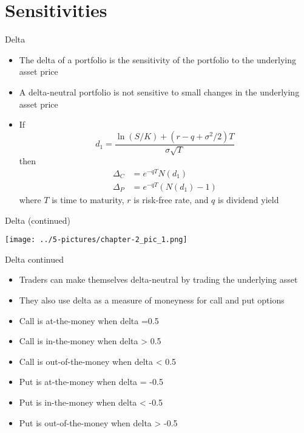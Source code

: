 \documentclass[11pt]{beamer}
\begin{document}
\section{Sensitivities}
\begin{frame}{Delta}
	\begin{itemize}
		\item The delta of a portfolio is the sensitivity of the portfolio to the underlying asset price
		\item A delta-neutral portfolio is not sensitive to small changes in the underlying asset price
		\item If   $$d_1=\frac{\ln(S/K)+(r-q+\sigma^2/2)T}{\sigma\sqrt{T}}$$ then \begin{align*}\Delta_C &= e^{-qT}N(d_1) \\ \Delta_P &= e^{-qT}\left(N(d_1)-1 \right)\end{align*} where $T$ is time to maturity, $r$ is risk-free rate, and $q$ is dividend yield
	\end{itemize}
\end{frame}
\begin{frame}{Delta (continued)}
	 
	\begin{center}
	\texttt{[image: ../5-pictures/chapter-2\_pic\_1.png]}
	\end{center}
\end{frame}
\begin{frame}{Delta continued}
	\begin{itemize}
		\item Traders can make themselves delta-neutral by trading the underlying asset
		\item They also use delta as a measure of moneyness for call and put options
		\item Call is at-the-money when delta =0.5
		\item Call is in-the-money when delta > 0.5
		\item Call is out-of-the-money when delta < 0.5
		\item Put is at-the-money when delta = -0.5
		\item Put is in-the-money when delta <  -0.5
		\item Put is out-of-the-money when delta >  -0.5
	\end{itemize}
\end{frame}
\end{document}

